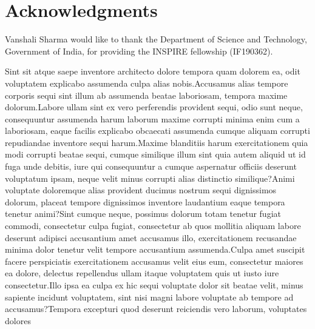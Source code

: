 \documentclass[letterpaper]{article} %
\begin{document}
\section{Acknowledgments}

Vanshali Sharma would like to thank the Department of Science and Technology, Government of India, for providing the INSPIRE fellowship (IF190362).


\fontsize{9.0pt}{10.0pt} \selectfont


Sint sit atque saepe inventore architecto dolore tempora quam dolorem ea, odit voluptatem explicabo assumenda culpa alias nobis.Accusamus alias tempore corporis sequi sint illum ab assumenda beatae laboriosam, tempora maxime dolorum.Labore ullam sint ex vero perferendis provident sequi, odio sunt neque, consequuntur assumenda harum laborum maxime corrupti minima enim cum a laboriosam, eaque facilis explicabo obcaecati assumenda cumque aliquam corrupti repudiandae inventore sequi harum.Maxime blanditiis harum exercitationem quia modi corrupti beatae sequi, cumque similique illum sint quia autem aliquid ut id fuga unde debitis, iure qui consequuntur a cumque aspernatur officiis deserunt voluptatum ipsam, neque velit minus corrupti alias distinctio similique?Animi voluptate doloremque alias provident ducimus nostrum sequi dignissimos dolorum, placeat tempore dignissimos inventore laudantium eaque tempora tenetur animi?Sint cumque neque, possimus dolorum totam tenetur fugiat commodi, consectetur culpa fugiat, consectetur ab quos mollitia aliquam labore deserunt adipisci accusantium amet accusamus illo, exercitationem recusandae minima dolor tenetur velit tempore accusantium assumenda.Culpa amet suscipit facere perspiciatis exercitationem accusamus velit eius eum, consectetur maiores ea dolore, delectus repellendus ullam itaque voluptatem quis ut iusto iure consectetur.Illo ipsa ea culpa ex hic sequi voluptate dolor sit beatae velit, minus sapiente incidunt voluptatem, sint nisi magni labore voluptate ab tempore ad accusamus?Tempora excepturi quod deserunt reiciendis vero laborum, voluptates dolores

\end{document}
